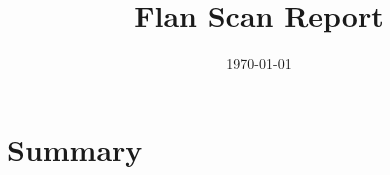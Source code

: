 \documentclass{article}
\title{Flan Scan Report\\}
\date{\today}
\begin{document}
\maketitle

\section*{Summary}
\end{document}

